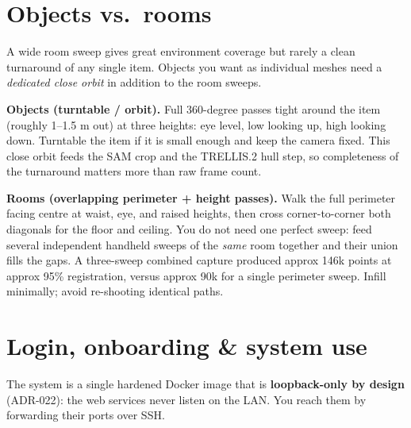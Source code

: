 \documentclass[a4paper,11pt]{article}
\begin{document}
\section{Objects vs.\ rooms}

\begin{technote}
A wide room sweep gives great environment coverage but rarely a clean turnaround of any single item.
Objects you want as individual meshes need a \emph{dedicated close orbit} in addition to the room
sweeps.
\end{technote}

\textbf{Objects (turntable / orbit).} Full 360-degree passes tight around the item (roughly 1--1.5 m
out) at three heights: eye level, low looking up, high looking down. Turntable the item if it is
small enough and keep the camera fixed. This close orbit feeds the SAM crop and the TRELLIS.2 hull
step, so completeness of the turnaround matters more than raw frame count.

\textbf{Rooms (overlapping perimeter + height passes).} Walk the full perimeter facing centre at
waist, eye, and raised heights, then cross corner-to-corner both diagonals for the floor and ceiling.
You do not need one perfect sweep: feed several independent handheld sweeps of the \emph{same} room
together and their union fills the gaps. A three-sweep combined capture produced approx 146k points
at approx 95\% registration, versus approx 90k for a single perimeter sweep. Infill minimally; avoid
re-shooting identical paths.

\section{Login, onboarding \& system use}

The system is a single hardened Docker image that is \textbf{loopback-only by design} (ADR-022): the
web services never listen on the LAN. You reach them by forwarding their ports over SSH.
\end{document}
